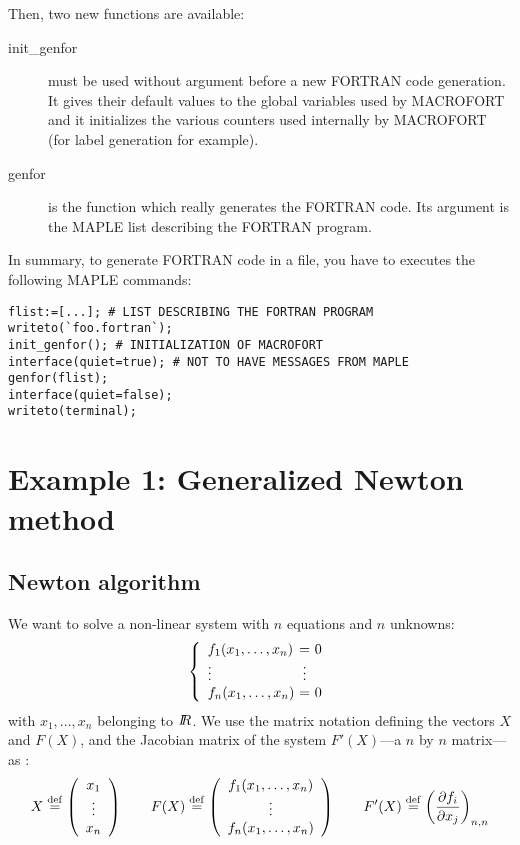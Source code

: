 Then, two new functions are available:
\begin{description}
  \item[init\_genfor] must be used without argument before a new FORTRAN code
generation. It gives their default values to the global variables used
by MACROFORT and it initializes the various counters used internally by
MACROFORT (for label generation for example).
  \item[genfor] is the function which really generates the FORTRAN code. Its
argument is the MAPLE list describing the FORTRAN program.
\end{description}

In summary, to generate FORTRAN code in a file, you have to executes
the following MAPLE commands:
\begin{verbatim}
flist:=[...]; # LIST DESCRIBING THE FORTRAN PROGRAM
writeto(`foo.fortran`);
init_genfor(); # INITIALIZATION OF MACROFORT
interface(quiet=true); # NOT TO HAVE MESSAGES FROM MAPLE
genfor(flist);
interface(quiet=false);
writeto(terminal);
\end{verbatim}

\section{Example 1: Generalized Newton method}
\label{e1}

\subsection{Newton algorithm}

We want to solve a non-linear system with $n$ equations and $n$ unknowns:
\[ \left\{
    \begin{array}{lcl}
      f_1(x_1,\ldots ,x_n) & \four!    =   \four! & 0 \\
      \vdots               & \four! \vdots \four! & \\
      f_n(x_1,\ldots ,x_n) & \four!    =   \four! & 0 \\
    \end{array}
  \right. \]
with $x_1,\ldots ,x_n$ belonging to $I\!\!R$.
We use the matrix notation defining the vectors $X$ and $F(X)$, and 
the Jacobian matrix of the system $F'(X)$---a $n$ by $n$ matrix---as :
\[
  X\stackrel{\rm def}{=}\left(\begin{array}{c} x_1 \\ \vdots \\ x_n \end{array}\right) \qquad
  F(X)\stackrel{\rm def}{=}\left(
    \begin{array}{c} f_1(x_1,\ldots,x_n) \\ \vdots \\f_n(x_1,\ldots,x_n)
    \end{array}\right) \qquad
  F'(X)\stackrel{\rm def}{=}{\left(\frac{\partial f_i}{\partial x_j}\right)}_{n,n}
\]

